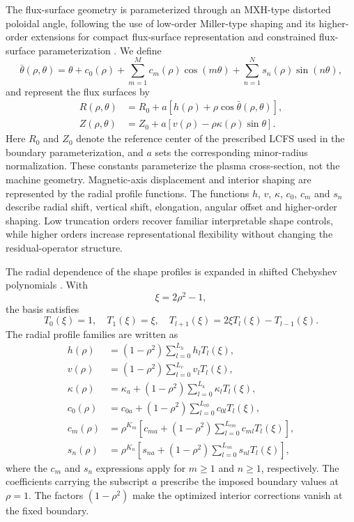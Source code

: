 \documentclass[final, 3p, times]{elsarticle}
\begin{document}
The flux-surface geometry is parameterized through an MXH-type distorted poloidal angle, following the use of low-order Miller-type shaping and its higher-order extensions for compact flux-surface representation and constrained flux-surface parameterization \cite{Miller1998,Arbon2021,Snoep2023}. We define
\begin{equation}
    \bar{\theta}(\rho,\theta)
    = \theta + c_0(\rho)
    + \sum_{m=1}^{M} c_m(\rho)\cos(m\theta)
    + \sum_{n=1}^{N} s_n(\rho)\sin(n\theta),
\end{equation}
and represent the flux surfaces by
\begin{align}
    R(\rho,\theta) & = R_0 + a\left[h(\rho) + \rho\cos\bar{\theta}(\rho,\theta)\right], \\
    Z(\rho,\theta) & = Z_0 + a\left[v(\rho) - \rho\kappa(\rho)\sin\theta\right].
\end{align}
Here $R_0$ and $Z_0$ denote the reference center of the prescribed LCFS used in the boundary parameterization, and $a$ sets the corresponding minor-radius normalization. These constants parameterize the plasma cross-section, not the machine geometry. Magnetic-axis displacement and interior shaping are represented by the radial profile functions. The functions $h$, $v$, $\kappa$, $c_0$, $c_m$ and $s_n$ describe radial shift, vertical shift, elongation, angular offset and higher-order shaping. Low truncation orders recover familiar interpretable shape controls, while higher orders increase representational flexibility without changing the residual-operator structure.

The radial dependence of the shape profiles is expanded in shifted Chebyshev polynomials \cite{Trefethen2000}. With
\begin{equation}
    \xi = 2\rho^2 - 1,
\end{equation}
the basis satisfies
\begin{equation}
    T_0(\xi)=1,\quad T_1(\xi)=\xi,\quad T_{l+1}(\xi)=2\xi T_l(\xi)-T_{l-1}(\xi).
\end{equation}
The radial profile families are written as
\begin{align}
    h(\rho)      & = (1-\rho^2)\sum_{l=0}^{L_h} h_l T_l(\xi),                                      \\
    v(\rho)      & = (1-\rho^2)\sum_{l=0}^{L_v} v_l T_l(\xi),                                      \\
    \kappa(\rho) & = \kappa_a + (1-\rho^2)\sum_{l=0}^{L_\kappa} \kappa_l T_l(\xi),                 \\
    c_0(\rho)    & = c_{0a} + (1-\rho^2)\sum_{l=0}^{L_{c0}} c_{0l}T_l(\xi),                        \\
    c_m(\rho)    & = \rho^{K_m}\left[c_{ma} + (1-\rho^2)\sum_{l=0}^{L_{cm}} c_{ml}T_l(\xi)\right], \\
    s_n(\rho)    & = \rho^{K_n}\left[s_{na} + (1-\rho^2)\sum_{l=0}^{L_{sn}} s_{nl}T_l(\xi)\right],
\end{align}
where the $c_m$ and $s_n$ expressions apply for $m\geq1$ and $n\geq1$, respectively. The coefficients carrying the subscript $a$ prescribe the imposed boundary values at $\rho=1$. The factors $(1-\rho^2)$ make the optimized interior corrections vanish at the fixed boundary.
\end{document}

